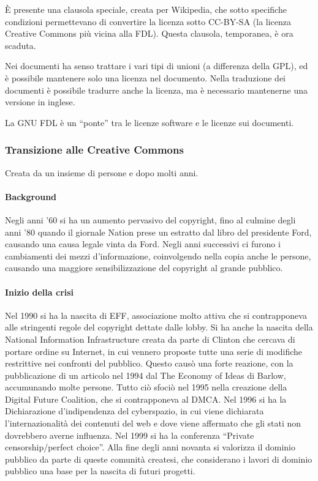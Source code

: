 \`E presente una clausola speciale, creata per Wikipedia, che sotto specifiche condizioni permettevano di convertire la licenza sotto CC-BY-SA (la licenza Creative Commons pi\`u vicina alla FDL). Questa clausola, temporanea, \`e ora scaduta.

Nei documenti ha senso trattare i vari tipi di unioni (a differenza della GPL), ed \`e possibile mantenere solo una licenza nel documento.
Nella traduzione dei documenti \`e possibile tradurre anche la licenza, ma \`e necessario mantenerne una versione in inglese.

La GNU FDL \`e un ``ponte'' tra le licenze software e le licenze sui documenti.

\subsubsection{Transizione alle Creative Commons}

Creata da un insieme di persone e dopo molti anni.

\paragraph*{Background}Negli anni '60 si ha un aumento pervasivo del copyright, fino al culmine degli anni '80 quando il giornale Nation prese un estratto dal libro del presidente Ford, causando una causa legale vinta da Ford. Negli anni successivi ci furono i cambiamenti dei mezzi d'informazione, coinvolgendo nella copia anche le persone, causando una maggiore sensibilizzazione del copyright al grande pubblico.

\paragraph*{Inizio della crisi}Nel 1990 si ha la nascita di EFF, associazione molto attiva che si contrapponeva alle stringenti regole del copyright dettate dalle lobby. Si ha anche la nascita della National Information Infrastructure creata da parte di Clinton che cercava di portare ordine su Internet, in cui vennero proposte tutte una serie di modifiche restrittive nei confronti del pubblico. Questo caus\`o una forte reazione, con la pubblicazione di un articolo nel 1994 dal The Economy of Ideas di Barlow, accumunando molte persone. Tutto ci\`o sfoci\`o nel 1995 nella creazione della Digital Future Coalition, che si contrapponeva al DMCA.
Nel 1996 si ha la Dichiarazione d'indipendenza del cyberspazio, in cui viene dichiarata l'internazionalit\`a dei contenuti del web e dove viene affermato che gli stati non dovrebbero averne influenza.
Nel 1999 si ha la conferenza ``Private censorship/perfect choice''.
Alla fine degli anni novanta si valorizza il dominio pubblico da parte di queste comunit\`a createsi, che considerano i lavori di dominio pubblico una base per la nascita di futuri progetti.
